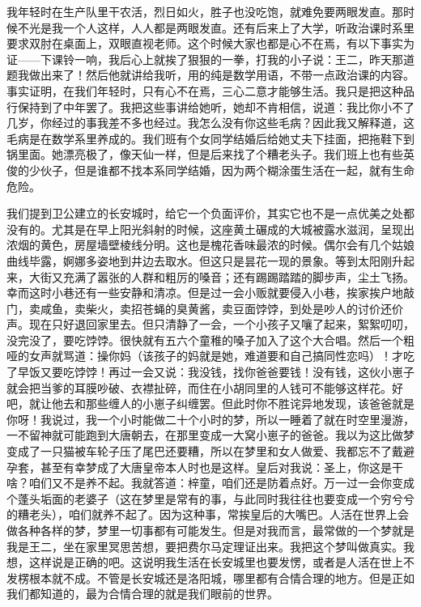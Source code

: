 我年轻时在生产队里干农活，烈日如火，胜子也没吃饱，就难免要两眼发直。那时候不光是我一个人这样，人人都是两眼发直。还有后来上了大学，听政治课时系里要求双肘在桌面上，双眼直视老师。这个时候大家也都是心不在焉，有以下事实为证——下课铃一响，我后心上就挨了狠狠的一拳，打我的小子说：王二，昨天那道题我做出来了！然后他就讲给我听，用的纯是数学用语，不带一点政治课的内容。事实证明，在我们年轻时，只有心不在焉，三心二意才能够生活。我只是把这种品行保持到了中年罢了。我把这些事讲给她听，她却不肯相信，说道：我比你小不了几岁，你经过的事我差不多也经过。我怎么没有你这些毛病？因此我又解释道，这毛病是在数学系里养成的。我们班有个女同学结婚后给她丈夫下挂面，把拖鞋下到锅里面。她漂亮极了，像天仙一样，但是后来找了个糟老头子。我们班上也有些英俊的少伙子，但是谁都不找本系同学结婚，因为两个糊涂蛋生活在一起，就有生命危险。 

我们提到卫公建立的长安城时，给它一个负面评价，其实它也不是一点优美之处都没有的。尤其是在早上阳光斜射的时候，这座黄土碾成的大城被露水滋润，呈现出浓烟的黄色，房屋墙壁棱线分明。这也是槐花香味最浓的时候。偶尔会有几个姑娘曲线毕露，婀娜多姿地到井边去取水。但这只是昙花一现的景象。等到太阳刚升起来，大街又充满了嚣张的人群和粗厉的嗓音；还有踢踢踏踏的脚步声，尘土飞扬。幸而这时小巷还有一些安静和清凉。但是过一会小贩就要侵入小巷，挨家挨户地敲门，卖咸鱼，卖柴火，卖招苍蝇的臭黄酱，卖豆面饽饽，到处是吵人的讨价还价声。现在只好退回家里去。但只清静了一会，一个小孩子又嚷了起来，絮絮叨叨，没完没了，要吃饽饽。很快就有五六个童稚的嗓子加入了这个大合唱。然后一个粗哑的女声就骂道：操你妈（该孩子的妈就是她，难道要和自己搞同性恋吗）！才吃了早饭又要吃饽饽！再过一会又说：我没钱，找你爸爸要钱！没有钱，这伙小崽子就会把当爹的耳膜吵破、衣襟扯碎，而住在小胡同里的人钱可不能够这样花。好吧，就让他去和那些缠人的小崽子纠缠罢。但此时你不胜诧异地发现，该爸爸就是你呀！我说过，我一个小时能做二十个小时的梦，所以一睡着了就在时空里漫游，一不留神就可能跑到大唐朝去，在那里变成一大窝小崽子的爸爸。我以为这比做梦变成了一只猫被车轮子压了尾巴还要糟，所以在梦里和女人做爱、我都忘不了戴避孕套，甚至有幸梦成了大唐皇帝本人时也是这样。皇后对我说：圣上，你这是干啥？咱们又不是养不起。我就答道：梓童，咱们还是防着点好。万一过一会你变成个蓬头垢面的老婆子（这在梦里是常有的事，与此同时我往往也要变成一个穷兮兮的糟老头），咱们就养不起了。因为这种事，常挨皇后的大嘴巴。人活在世界上会做各种各样的梦，梦里一切事都有可能发生。但是对我而言，最常做的一个梦就是我是王二，坐在家里冥思苦想，要把费尔马定理证出来。我把这个梦叫做真实。我想，这样说是正确的吧。这说明我生活在长安城里也要发愣，或者是人活在世上不发楞根本就不成。不管是长安城还是洛阳城，哪里都有合情合理的地方。但是正如我们都知道的，最为合情合理的就是我们眼前的世界。 

